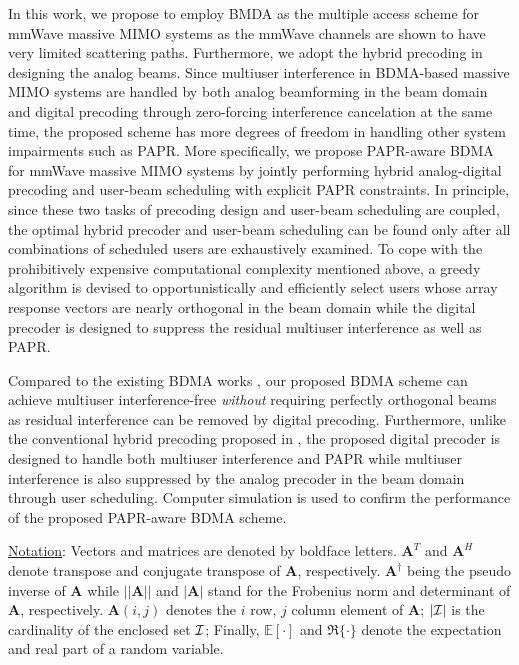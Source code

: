 \documentclass[conference]{IEEEtran}
\begin{document}
\setlength{\columnsep}{0.5 in}
In this work, we propose to employ BMDA as the multiple access scheme for mmWave massive MIMO systems as the mmWave channels are shown to have very limited scattering paths. Furthermore, we adopt the hybrid precoding in designing the analog beams. Since multiuser interference in BDMA-based massive MIMO systems are handled by both analog beamforming in the beam domain and digital precoding through zero-forcing interference cancelation at the same time, the proposed scheme has more degrees of freedom in handling other system impairments such as PAPR. More specifically, we propose PAPR-aware BDMA for mmWave massive MIMO systems by jointly performing hybrid analog-digital precoding and user-beam scheduling with explicit PAPR constraints. In principle, since these two tasks of precoding design and user-beam scheduling are coupled, the optimal hybrid precoder and user-beam scheduling can be found only after all combinations of scheduled users are exhaustively examined. To cope with the prohibitively expensive computational complexity mentioned above, a greedy algorithm is devised to opportunistically and efficiently select users whose array response vectors are nearly orthogonal in the beam domain while the digital precoder is designed to suppress the residual multiuser interference as well as PAPR.

\setlength{\columnsep}{1 in}
Compared to the existing BDMA works \cite{sun2015beam, Jiang2018}, our proposed BDMA scheme can achieve multiuser interference-free {\em without} requiring perfectly orthogonal beams as residual interference can be removed by digital precoding. Furthermore, unlike the conventional hybrid precoding proposed in \cite{alkhateeb2014channel}, the proposed digital precoder is designed to handle both multiuser interference and PAPR while multiuser interference is also suppressed by the analog precoder in the beam domain through user scheduling. Computer simulation is used to confirm the performance of the proposed PAPR-aware BDMA scheme.

\setlength{\columnsep}{1 in}
{\underline{Notation}: Vectors and matrices are denoted by boldface letters. ${\bm A}^T$ and ${\bm A}^H$ denote transpose and conjugate transpose of ${\bm A}$, respectively. $\bm{A}^\dagger$ being the pseudo inverse of $\bm{A}$ while $||\bm{A}|| $ and $|\bm{A}|$ stand for the Frobenius norm and determinant of ${\bm A}$, respectively. $\bm{A}(i,j)$ denotes the $i$ row, $j$ column element of ${\bm A}$; $|\cal{I}|$ is the cardinality of the enclosed set ${\cal I}$; Finally, $\mathbb{E}[ \cdot] $ and $\Re\{\cdot\}$ denote the expectation and real part of a random variable.}
\end{document}
